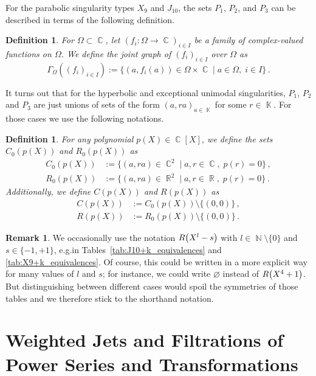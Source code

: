 \documentclass{amsproc}
\newtheorem{defn}[theorem]{Definition}
\theoremstyle{definition}
\newtheorem{remark}[theorem]{Remark}
\let\originalleft\left
\let\originalright\right
\renewcommand{\left}{\mathopen{}\mathclose\bgroup\originalleft}
\renewcommand{\right}{\aftergroup\egroup\originalright}
\DeclareMathOperator{\N}{\mathbb{N}}
\DeclareMathOperator{\R}{\mathbb{R}}
\DeclareMathOperator{\C}{\mathbb{C}}
\DeclareMathOperator{\K}{\mathbb{K}}
\begin{document}
For the parabolic singularity types $X_9$ and $J_{10}$, the sets $P_1$, $P_2$,
and $P_3$ can be described in terms of the following definition.

\begin{defn}
For $\Omega \subset \C$, let $(f_i: \Omega \rightarrow \C)_{i \in I}$ be a
family of complex-valued functions on $\Omega$. We define the joint graph of
$(f_i)_{i \in I}$ over $\Omega$ as
\[
\Gamma_\Omega((f_i)_{i \in I})
:= \{ (a, f_i(a)) \in \Omega \times \C \mid a\in \Omega,\; i \in I \}\,.
\]
\end{defn}

It turns out that for the hyperbolic and exceptional unimodal singularities,
$P_1$, $P_2$ and $P_3$ are just unions of sets of the form $(a, ra)_{a \in \K}$
for some $r \in \K$. For those cases we use the following notations.

\begin{defn}\label{def:C_R}
For any polynomial $p(X) \in \C[X]$, we define the sets $C_0(p(X))$ and
$R_0(p(X))$ as
\begin{align*}
C_0(p(X)) &:= \{ (a, ra) \in \C^2 \mid a, r \in \C, \; p(r) = 0 \} \,, \\
R_0(p(X)) &:= \{ (a, ra) \in \R^2 \mid a, r \in \R, \; p(r) = 0 \} \,.
\end{align*}
Additionally, we define $C(p(X))$ and $R(p(X))$ as
\begin{align*}
C(p(X)) &:= C_0(p(X)) \setminus \{(0, 0)\} \,, \\
R(p(X)) &:= R_0(p(X)) \setminus \{(0, 0)\} \,.
\end{align*}
\end{defn}

\begin{remark}
We occasionally use the notation $R\left(X^l-s\right)$ with
$l \in \N \setminus \{0\}$ and $s \in \{-1, +1\}$, e.g.\@ in
Tables~\ref{tab:J10+k_equivalences} and \ref{tab:X9+k_equivalences}. Of course,
this could be written in a more explicit way for many values of $l$ and $s$;
for instance, we could write $\varnothing$ instead of $R\left(X^4+1\right)$.
But distinguishing between different cases would spoil the symmetries of those
tables and we therefore stick to the shorthand notation.
\end{remark}


\section{Weighted Jets and Filtrations of Power Series and Transformations}%
\label{sec:weights}
\end{document}
